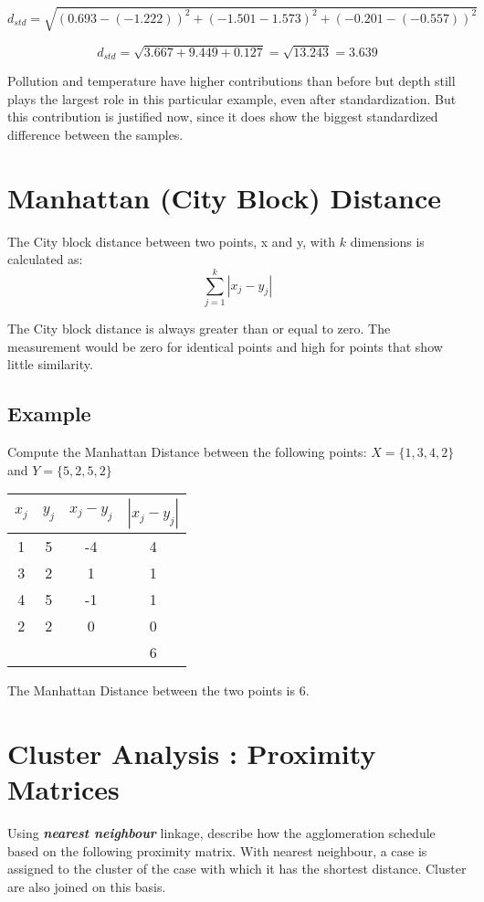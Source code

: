 \documentclass[12pt]{article}
\begin{document}
\[ d_{std} =  \sqrt{(0.693 - (- 1.222))^2 + (-1.501-1.573)^2 + (-0.201-(-0.557))^2} \]

\[ d_{std} = \sqrt{3.667 + 9.449 + 0.127} = \sqrt{13.243} = 3.639 \]

Pollution and temperature have higher contributions than before but depth still plays the
largest role in this particular example, even after standardization. But this contribution is
justified now, since it does show the biggest standardized difference between the samples. 
\newpage
\section{Manhattan (City Block) Distance}
The City block distance between two points, x and y, with $k$ dimensions is calculated as:
\[ \sum^{k}_{j=1} | x_j - y_j |  \]

The City block distance is always greater than or equal to zero. The measurement would be zero for identical points and high for points that show little similarity.

\subsection{Example}
Compute the Manhattan Distance between the following points: 
$X = \{1,3,4,2\}$ and $Y = \{5,2,5,2\}$


\begin{center}
\begin{tabular}{|c|c|c|c|}
  \hline
$x_j$	&	$y_j$	&   $x_j - y_j$	&	$| x_j - y_j |$	\\ \hline
1	&	5	&	-4	&	4	\\
3	&	2	&	1	&	1	\\
4	&	5	&	-1	&	1	\\
2	&	2	&	0	&	0	\\ \hline
& & & 6 \\
  \hline
\end{tabular}
\end{center}
The Manhattan Distance between the two points is 6.

\newpage
\section{Cluster Analysis : Proximity Matrices}

Using \textbf{\textit{nearest neighbour}} linkage, describe how the agglomeration schedule based on the following 
proximity matrix. With nearest neighbour, a case is assigned to the cluster of the case with which it has the shortest distance. Cluster are also joined on this basis.
\end{document}
